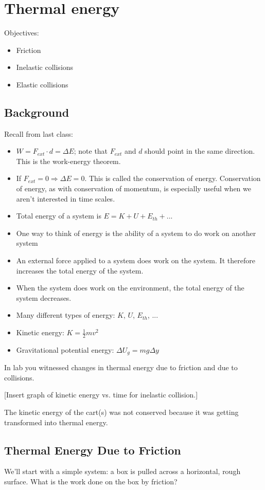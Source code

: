 \section{Thermal energy}
Objectives:
\begin{itemize}
\item Friction
\item Inelastic collisions
\item Elastic collisions
\end{itemize}

\subsection{Background}
Recall from last class:
\begin{itemize}
\item $W=F_{ext}\cdot d=\Delta{E}$; note that $F_{ext}$ and $d$ should point in the same direction. This is the work-energy theorem.
\item If $F_{ext}=0\Rightarrow \Delta{E}=0$. This is called the conservation of energy. Conservation of energy, as with conservation of momentum, is especially useful when we aren't interested in time scales.
\item Total energy of a system is $E=K+U+E_{th}+...$
\item One way to think of energy is the ability of a system to do work on another system
\item An external force applied to a system does work on the system. It therefore increases the total energy of the system.
\item When the system does work on the environment, the total energy of the system decreases.
\item Many different types of energy: $K$, $U$, $E_{th}$, $...$
\item Kinetic energy: $K=\frac{1}{2}mv^2$
\item Gravitational potential energy: $\Delta U_g=mg\Delta y$
\end{itemize}

In lab you witnessed changes in thermal energy due to friction and due to collisions.

[Insert graph of kinetic energy vs. time for inelastic collision.]
\vspace{5cm}

The kinetic energy of the cart(s) was not conserved because it was getting transformed into thermal energy.

\subsection{Thermal Energy Due to Friction}
We'll start with a simple system: a box is pulled across a horizontal, rough surface. What is the work done on the box by friction?

